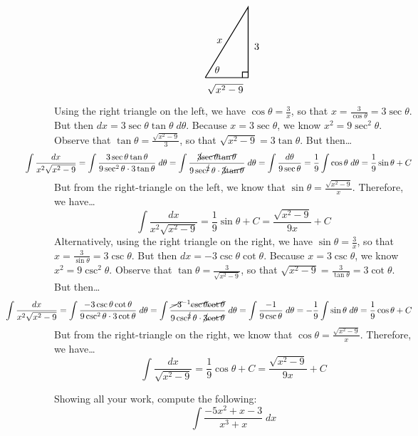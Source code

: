 \documentclass[12pt,letterpaper]{exam}
\begin{document}
\begin{questions}
{\[\begin{tikzpicture}
	\draw[line width=0.03cm] (0,0) -- (1.5,0) -- (1.5,2.5) -- (0,0);
	\draw[line width=0.03cm] (1.3,0) -- (1.3,0.2) -- (1.5,0.2);
	\node at (1.8,1.1) {$3$};
	\node at (0.7,-0.4) {$\sqrt{x^2 - 9}$};
	\node at (0.5,1.3) {$x$};
	\node at (0.42,0.28) {$\theta$};
	\end{tikzpicture}
	\]
Using the right triangle on the left, we have $\cos \theta= \frac{3}{x}$, so that $x= \frac{3}{\cos \theta}= 3 \sec \theta$. But then $dx= 3 \sec \theta \tan \theta \;d\theta$. Because $x= 3 \sec \theta$, we know $x^2= 9 \sec^2 \theta$. Observe that $\tan \theta= \frac{\sqrt{x^2 - 9}}{3}$, so that $\sqrt{x^2 - 9}= 3 \tan \theta$. But then\dots
	\[
	\hspace{-1.2cm}\int \dfrac{dx}{x^2\sqrt{x^2 - 9}}= \int \dfrac{3 \sec \theta \tan \theta}{9 \sec^2 \theta \cdot 3 \tan \theta} \;d\theta= \int \dfrac{\cancel{3} \cancel{\sec \theta} \cancel{\tan \theta}}{9 \sec^{\cancel{2}} \theta \cdot \cancel{3} \cancel{\tan \theta}} \;d\theta= \int \dfrac{d\theta}{9 \sec \theta}= \dfrac{1}{9} \int \cos \theta \;d\theta= \dfrac{1}{9} \sin \theta + C
	\]
But from the right-triangle on the left, we know that $\sin \theta= \frac{\sqrt{x^2 - 9}}{x}$. Therefore, we have\dots
	\[
	\int \dfrac{dx}{x^2\sqrt{x^2 - 9}}= \dfrac{1}{9} \sin \theta + C= \boxed{\frac{\sqrt{x^2 - 9}}{9x} + C}
	\] \pspace
Alternatively, using the right triangle on the right, we have $\sin \theta= \frac{3}{x}$, so that $x= \frac{3}{\sin \theta}= 3 \csc \theta$. But then $dx= -3 \csc \theta \cot \theta$. Because $x= 3 \csc \theta$, we know $x^2= 9 \csc^2 \theta$. Observe that $\tan \theta= \frac{3}{\sqrt{x^2 - 9}}$, so that $\sqrt{x^2 - 9}= \frac{3}{\tan \theta}= 3 \cot \theta$. But then\dots
	\[
	\hspace{-2cm}\int \dfrac{dx}{x^2\sqrt{x^2 - 9}}= \int \dfrac{-3 \csc \theta \cot \theta}{9 \csc^2 \theta \cdot 3 \cot \theta} \;d\theta= \int \dfrac{\cancel{-3}^{-1} \cancel{\csc \theta} \cancel{\cot \theta}}{9 \csc^{\cancel{2}} \theta \cdot \cancel{3} \cancel{\cot \theta}} \;d\theta= \int \dfrac{-1}{9 \csc \theta} \;d\theta= -\dfrac{1}{9} \int \sin \theta \;d\theta= \dfrac{1}{9} \cos \theta + C
	\]
But from the right-triangle on the right, we know that $\cos\theta= \frac{\sqrt{x^2 - 9}}{x}$. Therefore, we have\dots
	\[
	\int \dfrac{dx}{\sqrt{x^2 - 9}}= \dfrac{1}{9} \cos \theta + C= \boxed{\frac{\sqrt{x^2 - 9}}{9x} + C}
	\]
}



\newpage
\question[15] Showing all your work, compute the following:
	\[
	\int \dfrac{-5x^2 + x - 3}{x^3 + x} \;dx
	\] \pspace


\end{questions}
\end{document}
